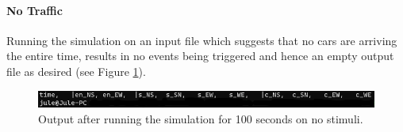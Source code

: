 \documentclass[10pt,bibliography=totocnumbered,listof=totocnumbered, footsepline, headsepline]{scrreprt}
\begin{document}
    \paragraph*{No Traffic}
    Running the simulation on an input file which suggests that no cars are arriving the entire time, results in no events being triggered and hence an empty output file as desired (see Figure \ref{fig:no_traffic}).
    \begin{figure}[H]
    	\centerline{\includegraphics[width=34pc]{no_traffic.png}}
    	\caption{Output after running the simulation for 100 seconds on no stimuli.}
    	\label{fig:no_traffic}
    \end{figure}
    
\end{document}
